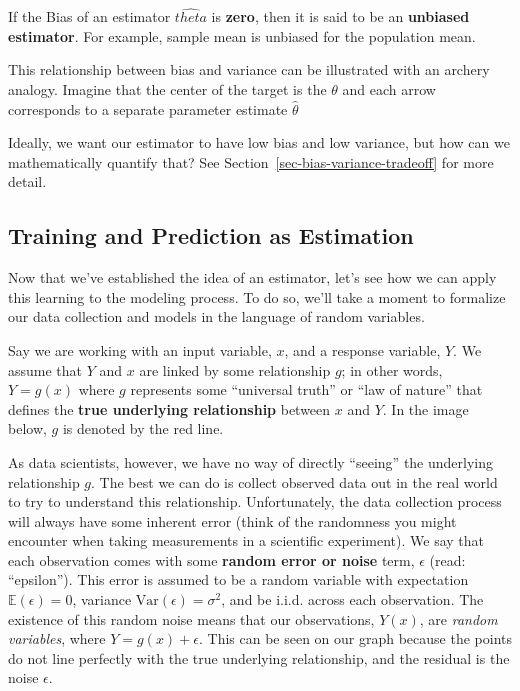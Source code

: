 \documentclass[
  letterpaper,
  DIV=11,
  numbers=noendperiod]{scrreprt}
\begin{document}
If the Bias of an estimator \(\hat{theta}\) is \textbf{zero}, then it is
said to be an \textbf{unbiased estimator}. For example, sample mean is
unbiased for the population mean.

This relationship between bias and variance can be illustrated with an
archery analogy. Imagine that the center of the target is the \(\theta\)
and each arrow corresponds to a separate parameter estimate
\(\hat{\theta}\)

Ideally, we want our estimator to have low bias and low variance, but
how can we mathematically quantify that? See
Section~\ref{sec-bias-variance-tradeoff} for more detail.

\subsection{Training and Prediction as
Estimation}\label{training-and-prediction-as-estimation}

Now that we've established the idea of an estimator, let's see how we
can apply this learning to the modeling process. To do so, we'll take a
moment to formalize our data collection and models in the language of
random variables.

Say we are working with an input variable, \(x\), and a response
variable, \(Y\). We assume that \(Y\) and \(x\) are linked by some
relationship \(g\); in other words, \(Y = g(x)\) where \(g\) represents
some ``universal truth'' or ``law of nature'' that defines the
\textbf{true underlying relationship} between \(x\) and \(Y\). In the
image below, \(g\) is denoted by the red line.

As data scientists, however, we have no way of directly ``seeing'' the
underlying relationship \(g\). The best we can do is collect observed
data out in the real world to try to understand this relationship.
Unfortunately, the data collection process will always have some
inherent error (think of the randomness you might encounter when taking
measurements in a scientific experiment). We say that each observation
comes with some \textbf{random error or noise} term, \(\epsilon\) (read:
``epsilon''). This error is assumed to be a random variable with
expectation \(\mathbb{E}(\epsilon)=0\), variance
\(\text{Var}(\epsilon) = \sigma^2\), and be i.i.d. across each
observation. The existence of this random noise means that our
observations, \(Y(x)\), are \emph{random variables}, where
\(Y = g(x) + \epsilon\). This can be seen on our graph because the
points do not line perfectly with the true underlying relationship, and
the residual is the noise \(\epsilon\).
\end{document}
